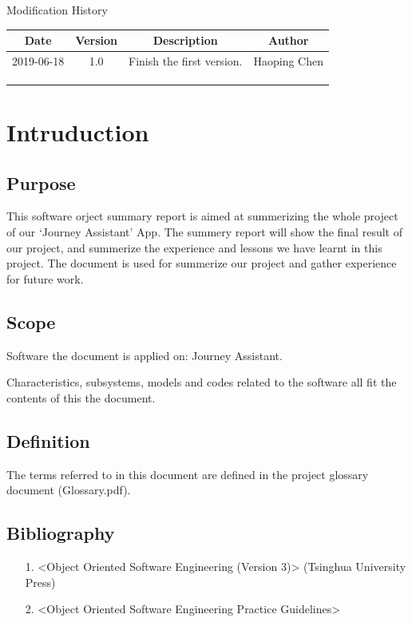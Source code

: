 \documentclass[10pt]{article}
\begin{document}
\newpage

\begin{center}
    {\LARGE Modification History}
    
    \begin{tabular}{|c|c|c|c|} 
        \hline 
        Date&Version&Description&Author\\
        \hline  
        2019-06-18&1.0&Finish the first version.&Haoping Chen\\
		\hline 
		& & & \\
		\hline
		& & & \\
		\hline
		& & & \\
		\hline
    \end{tabular}    
\end{center}

\newpage

\tableofcontents
\newpage

\section{Intruduction}
\subsection{Purpose}
This software orject summary report is aimed at summerizing the whole project of our ‘Journey Assistant’ App. The summery report will show the final result of our project, and summerize the experience and lessons we have learnt in this project. The document is used for summerize our project and gather experience for future work.

\subsection{Scope}
Software the document is applied on: Journey Assistant.

Characteristics, subsystems, models and codes related to the software all fit the contents of this the document.

\subsection{Definition}
The terms referred to in this document are defined in the project glossary document (Glossary.pdf).

\subsection{Bibliography}
\begin{itemize}
	\item[1.] <Object Oriented Software Engineering (Version 3)> (Tsinghua University Press)
	\item[2.] <Object Oriented Software Engineering Practice Guidelines> 
\end{itemize}
\end{document}
